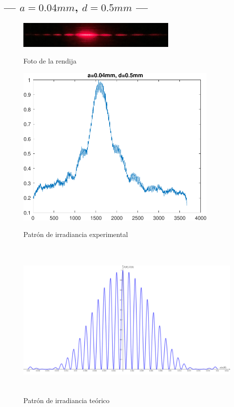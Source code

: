 \documentclass[12pt,a4paper]{article}
\begin{document}
	\newpage
	\subsection{--- \(a=0.04mm\), \(d=0.5mm\) ---} %
	\label{sub:a_bajo_d_alto}
	\begin{figure}[htbp!]
		\centering
		\includegraphics[width=0.7\textwidth]{3_RESUL/04_y_5.jpg}
		\caption{Foto de la rendija}
		\label{fig:A7}
		\includegraphics[width=0.7\linewidth,height=8cm]{3_RESUL/04_y_5.pdf}
		\caption{Patrón de irradiancia experimental}
		\label{fig:A8}
		\includegraphics[width=0.7\linewidth,height=8cm]{3_RESUL/Irradiancia 3.png}
		\caption{Patrón de irradiancia teórico}
		\label{fig:A9}
	\end{figure}
\end{document}
